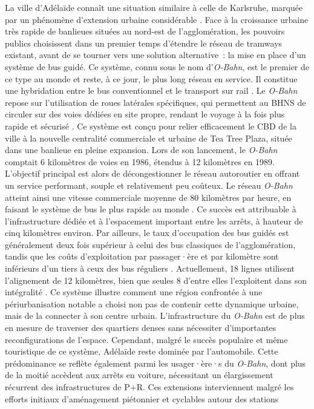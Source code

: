 \begin{refsegment}
{    La ville d’Adélaïde connaît une situation similaire à celle de Karlsruhe, marquée par un phénomène d'extension urbaine considérable \textcolor{blue}{\autocite[p.~362-377 (chapitre 14)]{cervero_transit_1998}}. Face à la croissance urbaine très rapide de banlieues situées au nord-est de l'agglomération, les pouvoirs publics choisissent dans un premier temps d’étendre le réseau de tramways existant, avant de se tourner vers une solution alternative~: la mise en place d’un système de bus guidé. Ce système, connu sous le nom d'\textsl{O-Bahn}, est le premier de ce type au monde et reste, à ce jour, le plus long réseau en service. Il constitue une hybridation entre le bus conventionnel et le transport sur rail \textcolor{blue}{\autocite[143]{currie_assessing_2014}}. Le \textsl{O-Bahn} repose sur l’utilisation de roues latérales spécifiques, qui permettent au \acrshort{BHNS} de circuler sur des voies dédiées en site propre, rendant le voyage à la fois plus rapide et sécurisé \textcolor{blue}{\autocite[2]{currie_bus_2006}}. Ce système est conçu pour relier efficacement le \acrfull{CBD} de la ville à la nouvelle centralité commerciale et urbaine de Tea Tree Plaza, située dans une banlieue en pleine expansion. Lors de son lancement, le \textsl{O-Bahn} comptait 6 kilomètres de voies en 1986, étendus à 12 kilomètres en 1989. L’objectif principal est alors de décongestionner le réseau autoroutier en offrant un service performant, souple et relativement peu coûteux. Le réseau \textsl{O-Bahn} atteint ainsi une vitesse commerciale moyenne de 80 kilomètres par heure, en faisant le système de bus le plus rapide au monde \textcolor{blue}{\autocite[3]{currie_bus_2006}}. Ce succès est attribuable à l’infrastructure dédiée et à l’espacement important entre les arrêts, à hauteur de cinq kilomètres environ. Par ailleurs, le taux d’occupation des bus guidés est généralement deux fois supérieur à celui des bus classiques de l’agglomération, tandis que les coûts d’exploitation par passager·ère et par kilomètre sont inférieurs d’un tiers à ceux des bus réguliers \textcolor{blue}{\autocite[7]{basbas_advances_2005}}. Actuellement, 18 lignes utilisent l’alignement de 12 kilomètres, bien que seules 8 d’entre elles l’exploitent dans son intégralité \textcolor{blue}{\autocite[3]{rogers_o-bahn_2002}}. Ce système illustre comment une région confrontée à une périurbanisation notable a choisi non pas de contenir cette dynamique urbaine, mais de la connecter à son centre urbain. L’infrastructure du \textsl{O-Bahn} est de plus en mesure de traverser des quartiers denses sans nécessiter d’importantes reconfigurations de l'espace. Cependant, malgré le succès populaire et même touristique de ce système, Adélaïde reste dominée par l’automobile. Cette prédominance se reflète également parmi les usager·ère·s du \textsl{O-Bahn}, dont plus de la moitié accèdent aux arrêts en voiture, nécessitant un élargissement récurrent des infrastructures de \acrfull{P+R}. Ces extensions interviennent malgré les efforts initiaux d'aménagement piétonnier et cyclables autour des stations }
\end{refsegment}
